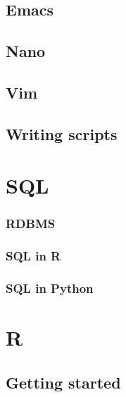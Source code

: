 \documentclass[
]{book}
\begin{document}
\hypertarget{emacs}{%
\section{Emacs}\label{emacs}}

\hypertarget{nano}{%
\section{Nano}\label{nano}}

\hypertarget{vim}{%
\section{Vim}\label{vim}}

\hypertarget{writing-scripts}{%
\section{Writing scripts}\label{writing-scripts}}

\hypertarget{sql}{%
\chapter{SQL}\label{sql}}

\hypertarget{rdbms}{%
\subsection{RDBMS}\label{rdbms}}

\hypertarget{sql-in-r}{%
\subsection{SQL in R}\label{sql-in-r}}

\hypertarget{sql-in-python}{%
\subsection{SQL in Python}\label{sql-in-python}}

\hypertarget{r}{%
\chapter{R}\label{r}}

\hypertarget{getting-started-with-r}{%
\section{Getting started}\label{getting-started-with-r}}
\end{document}
